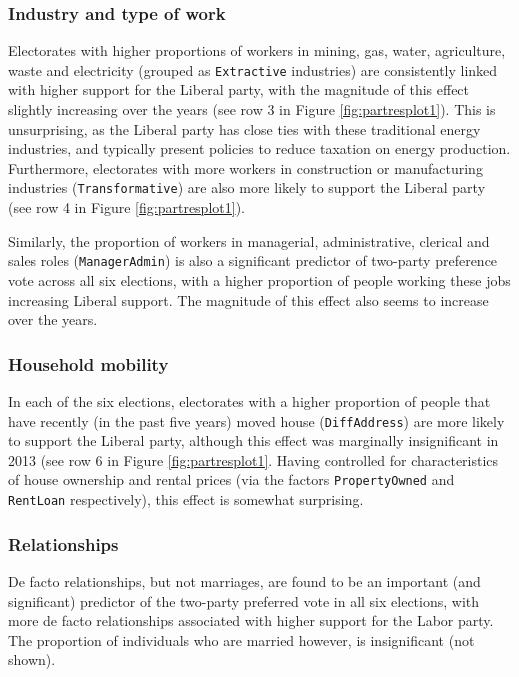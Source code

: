 \documentclass[11pt,a4paper,]{article}
\begin{document}
\subsubsection{Industry and type of
work}\label{industry-and-type-of-work}

Electorates with higher proportions of workers in mining, gas, water,
agriculture, waste and electricity (grouped as \texttt{Extractive}
industries) are consistently linked with higher support for the Liberal
party, with the magnitude of this effect slightly increasing over the
years (see row 3 in Figure \ref{fig:partresplot1}). This is
unsurprising, as the Liberal party has close ties with these traditional
energy industries, and typically present policies to reduce taxation on
energy production. Furthermore, electorates with more workers in
construction or manufacturing industries (\texttt{Transformative}) are
also more likely to support the Liberal party (see row 4 in Figure
\ref{fig:partresplot1}).

Similarly, the proportion of workers in managerial, administrative,
clerical and sales roles (\texttt{ManagerAdmin}) is also a significant
predictor of two-party preference vote across all six elections, with a
higher proportion of people working these jobs increasing Liberal
support. The magnitude of this effect also seems to increase over the
years.

\subsubsection{Household mobility}\label{household-mobility}

In each of the six elections, electorates with a higher proportion of
people that have recently (in the past five years) moved house
(\texttt{DiffAddress}) are more likely to support the Liberal party,
although this effect was marginally insignificant in 2013 (see row 6 in
Figure \ref{fig:partresplot1}. Having controlled for characteristics of
house ownership and rental prices (via the factors
\texttt{PropertyOwned} and \texttt{RentLoan} respectively), this effect
is somewhat surprising.

\subsubsection{Relationships}\label{relationships}

De facto relationships, but not marriages, are found to be an important
(and significant) predictor of the two-party preferred vote in all six
elections, with more de facto relationships associated with higher
support for the Labor party. The proportion of individuals who are
married however, is insignificant (not shown).
\end{document}
